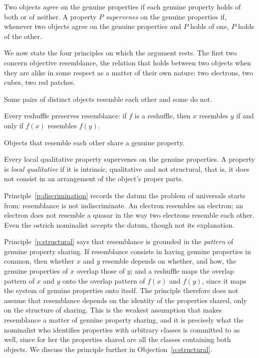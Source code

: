 \documentclass{situationist-preprint}
\begin{document}
\begin{definition}\label{d:supervene}
Two objects \emph{agree} on the genuine properties if each genuine property holds of both or of neither. A property $P$ \emph{supervenes} on the genuine properties if, whenever two objects agree on the genuine properties and $P$ holds of one, $P$ holds of the other.
\end{definition}

We now state the four principles on which the argument rests. The first two concern objective resemblance, the relation that holds between two objects when they are alike in some respect as a matter of their own nature: two electrons, two cubes, two red patches.

\begin{principle}[Discrimination]\label{p:discrimination}
Some pairs of distinct objects resemble each other and some do not.
\end{principle}

\begin{principle}\label{p:structural}
Every reshuffle preserves resemblance: if $f$ is a reshuffle, then $x$ resembles $y$ if and only if $f(x)$ resembles $f(y)$.
\end{principle}

\begin{principle}\label{p:shared}
Objects that resemble each other share a genuine property.
\end{principle}

\begin{principle}[Completeness]\label{p:complete}
Every local qualitative property supervenes on the genuine properties. A property is \emph{local qualitative} if it is intrinsic, qualitative and not structural, that is, it does not consist in an arrangement of the object's proper parts.
\end{principle}

Principle~\ref{p:discrimination} records the datum the problem of universals starts from: resemblance is not indiscriminate. An electron resembles an electron; an electron does not resemble a quasar in the way two electrons resemble each other. Even the ostrich nominalist accepts the datum, though not its explanation.

Principle~\ref{p:structural} says that resemblance is grounded in the \emph{pattern} of genuine property sharing. If resemblance consists in having genuine properties in common, then whether $x$ and $y$ resemble depends on whether, and how, the genuine properties of $x$ overlap those of $y$; and a reshuffle maps the overlap pattern of $x$ and $y$ onto the overlap pattern of $f(x)$ and $f(y)$, since it maps the system of genuine properties onto itself. The principle therefore does not assume that resemblance depends on the identity of the properties shared, only on the structure of sharing. This is the weakest assumption that makes resemblance a matter of genuine property sharing, and it is precisely what the nominalist who identifies properties with arbitrary classes is committed to as well, since for her the properties shared are all the classes containing both objects. We discuss the principle further in Objection~\ref{o:structural}.
\end{document}
